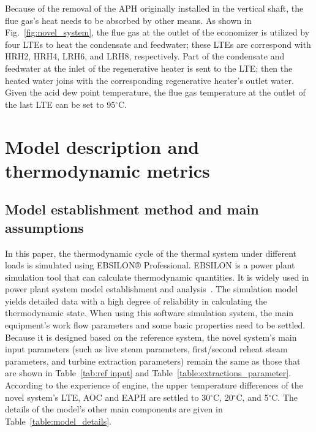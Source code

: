 \documentclass[preprint,12pt]{elsarticle}
\begin{document}
Because of the removal of the APH originally installed in the vertical shaft, the flue gas's heat needs to be absorbed by other means.
As shown in Fig.~\ref{fig:novel_system}, the flue gas at the outlet of the economizer is utilized by four LTEs to heat the condensate and feedwater; these LTEs are correspond with HRH2, HRH4, LRH6, and LRH8, respectively. 
Part of the condensate and feedwater at the inlet of the regenerative heater is sent to the LTE; then the heated water joins with the corresponding regenerative heater's outlet water. 
Given the acid dew point temperature, the flue gas temperature at the outlet of the last LTE can be set to 95$^\circ$C. 

\section{Model description and thermodynamic metrics}
\label{ssub:model_establishment_and_system_analysis_method}

\subsection{Model establishment method and main assumptions}
\label{ssub3:modle description}

In this paper, the thermodynamic cycle of the thermal system under different loads is simulated using EBSILON® Professional.
EBSILON is a power plant simulation tool that can calculate thermodynamic quantities. It is widely used in power plant system model establishment and analysis~\cite{Li2015Integrated,Yao2017Multi}. 
The simulation model yields detailed data with a high degree of reliability in calculating the thermodynamic state.
When using this software simulation system, the main equipment's work flow parameters and some basic properties need to be settled.
Because it is designed based on the reference system, the novel system's main input parameters (such as live steam parameters, first/second reheat steam parameters, and turbine extraction parameters) remain the same as those that are shown in Table~\ref{tab:ref input} and Table~\ref{table:extractions_parameter}.
According to the experience of engine, the upper temperature differences of the novel system's LTE, AOC and EAPH are settled to 30$^\circ$C, 20$^\circ$C, and 5$^\circ$C. 
The details of the model's other main components are given in Table~\ref{table:model_details}. 
\end{document}
